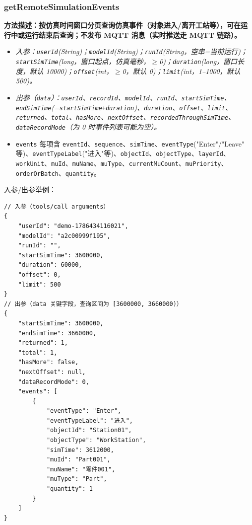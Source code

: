 \subsubsection{getRemoteSimulationEvents}
\bf{方法描述}：按仿真时间窗口分页查询仿真事件（对象进入/离开工站等），可在运行中或运行结束后查询；不发布 MQTT 消息（实时推送走 MQTT 链路）。
\begin{itemize}
	\item \it{入参}：\texttt{userId}(String)；\texttt{modelId}(String)；\texttt{runId}(String，空串=当前运行)；\texttt{startSimTime}(long，窗口起点，仿真毫秒，$\geq$0)；\texttt{duration}(long，窗口长度，默认 10000)；\texttt{offset}(int，$\geq$0，默认 0)；\texttt{limit}(int，1--1000，默认 500)。
	\item \it{出参}（\texttt{data}）：\texttt{userId}、\texttt{recordId}、\texttt{modelId}、\texttt{runId}、\texttt{startSimTime}、\texttt{endSimTime}(=\texttt{startSimTime+duration})、\texttt{duration}、\texttt{offset}、\texttt{limit}、\texttt{returned}、\texttt{total}、\texttt{hasMore}、\texttt{nextOffset}、\texttt{recordedThroughSimTime}、\texttt{dataRecordMode}（为 0 时事件列表可能为空）。
	\item \texttt{events} 每项含 \texttt{eventId}、\texttt{sequence}、\texttt{simTime}、\texttt{eventType}("Enter"/"Leave" 等)、\texttt{eventTypeLabel}("进入"等)、\texttt{objectId}、\texttt{objectType}、\texttt{layerId}、\texttt{workUnit}、\texttt{muId}、\texttt{muName}、\texttt{muType}、\texttt{currentMuCount}、\texttt{muPriority}、\texttt{orderOrBatch}、\texttt{quantity}。
\end{itemize}
入参/出参举例：
\begin{lstlisting}
// 入参（tools/call arguments）
{
    "userId": "demo-1786434116021",
    "modelId": "a2c00999f195",
    "runId": "",
    "startSimTime": 3600000,
    "duration": 60000,
    "offset": 0,
    "limit": 500
}
// 出参（data 关键字段，查询区间为 [3600000, 3660000)）
{
    "startSimTime": 3600000,
    "endSimTime": 3660000,
    "returned": 1,
    "total": 1,
    "hasMore": false,
    "nextOffset": null,
    "dataRecordMode": 0,
    "events": [
        {
            "eventType": "Enter",
            "eventTypeLabel": "进入",
            "objectId": "Station01",
            "objectType": "WorkStation",
            "simTime": 3612000,
            "muId": "Part001",
            "muName": "零件001",
            "muType": "Part",
            "quantity": 1
        }
    ]
}
\end{lstlisting}\vspace{-30pt}

